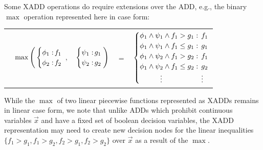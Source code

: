 Some XADD operations do require extensions over the ADD, e.g., the
binary $\max$ operation represented here in case form:

\vspace{-5mm}
{\footnotesize
\begin{center}
\begin{tabular}{r c c c l}
&
\hspace{-7mm} $\max \Bigg(
  \begin{cases}
    \phi_1: \hspace{-2mm} & \hspace{-1mm} f_1 \\ 
    \phi_2: \hspace{-2mm} & \hspace{-1mm} f_2 \\ 
  \end{cases}$
$,$
&
\hspace{-4mm}
  $\begin{cases}
    \psi_1: \hspace{-2mm} & \hspace{-1mm} g_1 \\ 
    \psi_2: \hspace{-2mm} & \hspace{-1mm} g_2 \\ 
  \end{cases} \Bigg)$
&
\hspace{-4mm} 
$ = $
&
\hspace{-4mm}
  $\begin{cases}
  \phi_1 \wedge \psi_1 \wedge f_1 > g_1    : & \hspace{-2mm} f_1 \\ 
  \phi_1 \wedge \psi_1 \wedge f_1 \leq g_1 : & \hspace{-2mm} g_1 \\ 
  \phi_1 \wedge \psi_2 \wedge f_1 > g_2    : & \hspace{-2mm}f_1 \\ 
  \phi_1 \wedge \psi_2 \wedge f_1 \leq g_2 : & \hspace{-2mm} g_2 \\ 
  \hspace{1cm}\vdots \hspace{8mm} & \hspace{-2mm} \vdots
  \end{cases}$
\end{tabular}
\end{center}
\vspace{-3mm}
} While the $\max$ of two linear piecewise functions represented as
XADDs remains in linear case form, we note that unlike ADDs which
prohibit continuous variables $\vec{x}$ and have a fixed set of
boolean decision variables, the XADD representation may need to create
new decision nodes for the linear inequalities $\{ f_1 > g_1, f_1 >
g_2, f_2 > g_1, f_2 > g_2 \}$ over $\vec{x}$ as a result of the $\max$.

